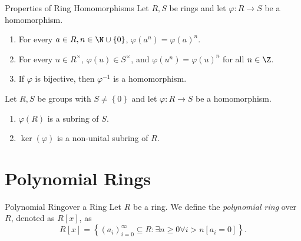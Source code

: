 \documentclass[pmath347]{subfiles}
\begin{document}
    \clearpage
    \begin{prop}{Properties of Ring Homomorphisms}
        Let $R,S$ be rings and let $\varphi:R\to S$ be a homomorphism.
        \begin{enumerate}
            \item For every $a\in R, n\in\N\cup\left\lbrace 0 \right\rbrace$, $\varphi\left( a^n \right) = \varphi\left( a \right) ^n$.
            \item For every $u\in R^\times$, $\varphi\left( u \right) \in S^\times$, and $\varphi\left( u^n \right) =\varphi\left( u \right) ^n$ for all $n\in\Z$.
            \item If $\varphi$ is bijective, then $\varphi^{-1}$ is a homomorphism.
        \end{enumerate}
    \end{prop}
    
    \begin{prop}{}
        Let $R,S$ be groups with $S\neq\left\lbrace 0 \right\rbrace$ and let $\varphi:R\to S$ be a homomorphism.
        \begin{enumerate}
            \item $\varphi\left( R \right)$ is a subring of $S$.
            \item $\ker\left( \varphi \right)$ is a non-unital subring of $R$.
        \end{enumerate}
    \end{prop}

    \section{Polynomial Rings}
    
    \begin{definition}{Polynomial Ring}{over a Ring}
        Let $R$ be a ring. We define the \emph{polynomial ring} over $R$, denoted as $R\left[ x \right]$, as
        \begin{equation*}
            R\left[ x \right] = \left\lbrace \left( a_{i} \right)^{\infty}_{i=0} \subseteq R: \exists n\geq 0 \forall i> n \left[ a_i = 0 \right] \right\rbrace .
        \end{equation*}
    \end{definition}
\end{document}
